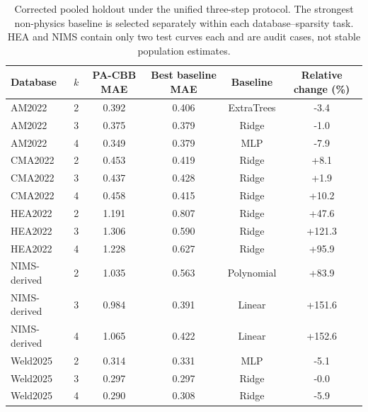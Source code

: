 \begin{table}[t]
\caption{Corrected pooled holdout under the unified three-step protocol. The strongest non-physics baseline is selected separately within each database--sparsity task. HEA and NIMS contain only two test curves each and are audit cases, not stable population estimates.}
\label{tab:pooled_final}
\centering\scriptsize\setlength{\tabcolsep}{4pt}
\begin{tabular}{lccccc}
\toprule
Database & $k$ & PA-CBB MAE & Best baseline MAE & Baseline & Relative change (\%) \\
\midrule
AM2022 & 2 & 0.392 & 0.406 & ExtraTrees & -3.4 \\
AM2022 & 3 & 0.375 & 0.379 & Ridge & -1.0 \\
AM2022 & 4 & 0.349 & 0.379 & MLP & -7.9 \\
CMA2022 & 2 & 0.453 & 0.419 & Ridge & +8.1 \\
CMA2022 & 3 & 0.437 & 0.428 & Ridge & +1.9 \\
CMA2022 & 4 & 0.458 & 0.415 & Ridge & +10.2 \\
HEA2022 & 2 & 1.191 & 0.807 & Ridge & +47.6 \\
HEA2022 & 3 & 1.306 & 0.590 & Ridge & +121.3 \\
HEA2022 & 4 & 1.228 & 0.627 & Ridge & +95.9 \\
NIMS-derived & 2 & 1.035 & 0.563 & Polynomial & +83.9 \\
NIMS-derived & 3 & 0.984 & 0.391 & Linear & +151.6 \\
NIMS-derived & 4 & 1.065 & 0.422 & Linear & +152.6 \\
Weld2025 & 2 & 0.314 & 0.331 & MLP & -5.1 \\
Weld2025 & 3 & 0.297 & 0.297 & Ridge & -0.0 \\
Weld2025 & 4 & 0.290 & 0.308 & Ridge & -5.9 \\
\bottomrule
\end{tabular}
\end{table}